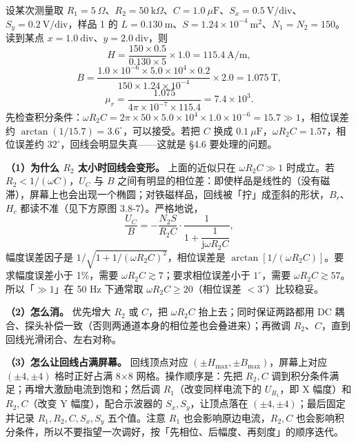 \documentclass[11pt]{ctexart}
\begin{document}

设某次测量取 \(R_1=5\ \Omega\)、\(R_2=50\ \mathrm{k}\Omega\)、\(C=1.0\ \mu\mathrm{F}\)、\(S_x=0.5\ \mathrm{V/div}\)、\(S_y=0.2\ \mathrm{V/div}\)，样品 1 的 \(L=0.130\ \mathrm{m}\)、\(S=1.24\times10^{-4}\ \mathrm{m^2}\)、\(N_1=N_2=150\)。读到某点 \(x=1.0\ \mathrm{div}\)、\(y=2.0\ \mathrm{div}\)，则
\[
H=\frac{150\times0.5}{0.130\times5}\times1.0=115.4\ \mathrm{A/m},
\]
\[
B=\frac{1.0\times10^{-6}\times5.0\times10^4\times0.2}{150\times1.24\times10^{-4}}\times2.0
=1.075\ \mathrm{T},
\]
\[
\mu_r=\frac{1.075}{4\pi\times10^{-7}\times115.4}=7.4\times10^3.
\]
先检查积分条件：\(\omega R_2C=2\pi\times50\times5.0\times10^4\times1.0\times10^{-6}=15.7\gg1\)，相位误差约 \(\arctan(1/15.7)=3.6^\circ\)，可以接受。若把 \(C\) 换成 \(0.1\ \mu\mathrm{F}\)，\(\omega R_2C=1.57\)，相位误差约 \(32^\circ\)，回线会明显失真——这就是 §4.6 要处理的问题。


\textbf{（1）为什么 \(R_2\) 太小时回线会变形。} 上面的近似只在 \(\omega R_2C\gg1\) 时成立。若 \(R_2<1/(\omega C)\)，\(U_C\) 与 \(B\) 之间有明显的相位差：即使样品是线性的（没有磁滞），屏幕上也会出现一个椭圆；对铁磁样品，回线被「拧」成歪斜的形状，\(B_r\)、\(H_c\) 都读不准（见下方原图 3.8-7）。严格地说，
\[
\frac{U_C}{B}
=-\frac{N_2S}{R_2C}\cdot\frac{1}{1+\dfrac{1}{\mathrm{j}\omega R_2C}},
\]
幅度误差因子是 \(1/\sqrt{1+1/(\omega R_2C)^2}\)，相位误差是 \(\arctan[1/(\omega R_2C)]\)。要求幅度误差小于 1\%，需要 \(\omega R_2C\gtrsim7\)；要求相位误差小于 \(1^\circ\)，需要 \(\omega R_2C\gtrsim57\)。所以「\(\gg1\)」在 50 Hz 下通常取 \(\omega R_2C\ge20\)（相位误差 \(<3^\circ\)）比较稳妥。



\textbf{（2）怎么消。} 优先增大 \(R_2\) 或 \(C\)，把 \(\omega R_2C\) 抬上去；同时保证两路都用 DC 耦合、探头补偿一致（否则两通道本身的相位差也会叠进来）；再微调 \(R_2\)、\(C\)，直到回线光滑闭合、左右对称。

\textbf{（3）怎么让回线占满屏幕。} 回线顶点对应 \((\pm H_{\max},\pm B_{\max})\)，屏幕上对应 \((\pm4,\pm4)\) 格时正好占满 8\(\times\)8 网格。操作顺序是：先把 \(R_2,C\) 调到积分条件满足；再增大激励电流到饱和；然后调 \(R_1\)（改变同样电流下的 \(U_{R_1}\)，即 X 幅度）和 \(R_2,C\)（改变 Y 幅度），配合示波器的 \(S_x,S_y\)，让顶点落在 \((\pm4,\pm4)\)；最后固定并记录 \(R_1,R_2,C,S_x,S_y\) 五个值。注意 \(R_1\) 也会影响原边电流，\(R_2,C\) 也会影响积分条件，所以不要指望一次调好，按「先相位、后幅度、再刻度」的顺序迭代。
\end{document}
